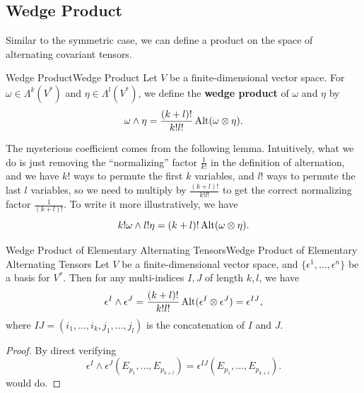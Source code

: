 \documentclass[../main.tex]{subfiles}
\begin{document}
\subsection{Wedge Product}
Similar to the symmetric case, we can define a product on the space of alternating covariant tensors.

\begin{definition}{Wedge Product}{Wedge Product}
  Let $V$ be a finite-dimensional vector space. For $\omega \in \Lambda^k(V^*)$ and $\eta \in \Lambda^l(V^*)$, we define the \textbf{wedge product} of $\omega$ and $\eta$ by
  \begin{equation}
    \omega \wedge \eta = \frac{(k+l)!}{k!l!} \operatorname{Alt}(\omega \otimes \eta).
  \end{equation}
\end{definition}
The mysterious coefficient comes from the following lemma. Intuitively, what we do is just removing the ``normalizing'' factor $\frac{1}{k!}$ in the definition of alternation, and we have $k!$ ways to permute the first $k$ variables, and $l!$ ways to permute the last $l$ variables, so we need to multiply by $\frac{(k+l)!}{k!l!}$ to get the correct normalizing factor $\frac{1}{(k+l)!}$. To write it more illustratively, we have
\begin{equation*}
  k! \omega \wedge l! \eta = (k+l)! \operatorname{Alt}(\omega \otimes \eta).
\end{equation*}

\begin{lemma}{Wedge Product of Elementary Alternating Tensors}{Wedge Product of Elementary Alternating Tensors}
  Let $V$ be a finite-dimensional vector space, and $\{\epsilon^1, \dots, \epsilon^n\}$ be a basis for $V^*$. Then for any multi-indices $I,J$ of length $k,l$, we have
  \begin{equation}
    \epsilon^I \wedge \epsilon^J = \frac{(k+l)!}{k!l!} \operatorname{Alt}(\epsilon^I \otimes \epsilon^J) = \epsilon^{IJ},
  \end{equation}
  where $IJ = (i_1, \dots, i_k, j_1, \dots, j_l)$ is the concatenation of $I$ and $J$.
\end{lemma}
\begin{proof}
  By direct verifying
  \begin{equation*}
    \epsilon^I \wedge \epsilon^J(E_{p_1}, \dots, E_{p_{k+l}}) = \epsilon^{IJ}(E_{p_1}, \dots, E_{p_{k+l}}).
  \end{equation*}
  would do.
\end{proof}
\end{document}
